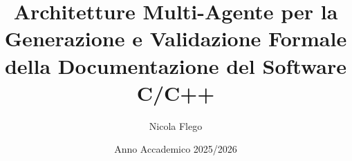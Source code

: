 \documentclass[12pt,a4paper,twoside,openright]{report}
\begin{document}
\title{\textbf{Architetture Multi-Agente per la Generazione e Validazione Formale della Documentazione del Software C/C++}}
\author{Nicola Flego}
\date{Anno Accademico 2025/2026}

\maketitle

\tableofcontents







\end{document}
